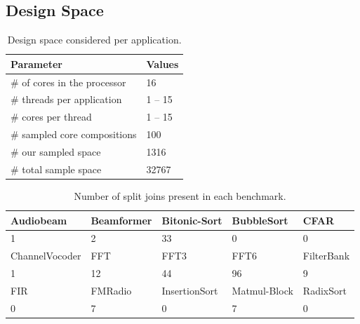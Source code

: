 \subsection{Design Space}

\begin{table}
\centering
\begin{tabular} { p{5.2cm}  p{1.8cm} }
      \toprule
      \textbf{Parameter} & \textbf{Values} \\ \midrule
      \# of cores in the processor & 16 \\
      \# threads per application & 1 -- 15 \\
      \# cores per thread & 1 -- 15 \\ \midrule
      \# sampled core compositions & 100 \\ 
      \# our sampled space & 1316 \\
      \# total sample space & 32767 \\ \bottomrule
    \end{tabular}
  \caption{Design space considered per application.}
  \label{tab:space}
\end{table}

\begin{table}[!htb]
  \small
 \begin{tabular} { | l | l | l | l | l | }
 \hline
   \cellcolor[gray]{0.7}Audiobeam&  \cellcolor[gray]{0.7} Beamformer& \cellcolor[gray]{0.7}Bitonic-Sort  &  \cellcolor[gray]{0.7} BubbleSort &  \cellcolor[gray]{0.7}  CFAR\\ \hline
  1 & 2 & 33 & 0 & 0 \\ \hline
   \cellcolor[gray]{0.7}ChannelVocoder &  \cellcolor[gray]{0.7} FFT&  \cellcolor[gray]{0.7}FFT3 &  \cellcolor[gray]{0.7} FFT6&  \cellcolor[gray]{0.7}FilterBank \\ \hline
  1 & 12 & 44 & 96 & 9 \\ \hline 
   \cellcolor[gray]{0.7}FIR &  \cellcolor[gray]{0.7} FMRadio &  \cellcolor[gray]{0.7} InsertionSort &  \cellcolor[gray]{0.7} Matmul-Block &  \cellcolor[gray]{0.7} RadixSort\\ \hline
  0 & 7 & 0 & 7 & 0 \\ \hline
 \end{tabular}
  \caption{Number of split joins present in each benchmark.}\label{tab:splitjoin}
\end{table}

